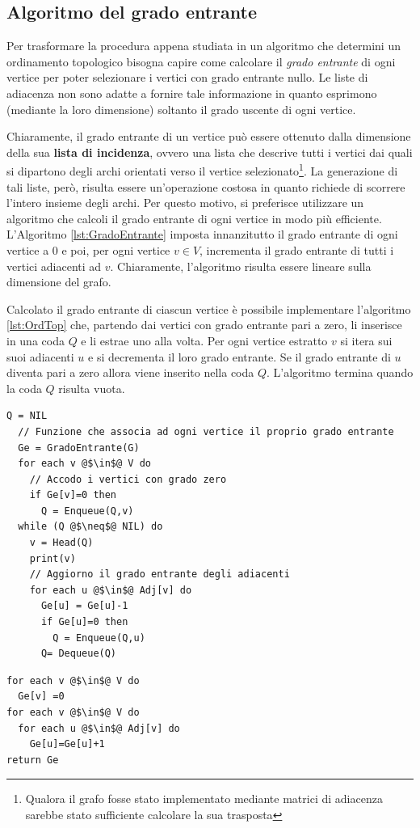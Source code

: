 \subsection{Algoritmo del grado entrante}
Per trasformare la procedura appena studiata in un algoritmo che determini un ordinamento topologico bisogna capire come calcolare il \textit{grado entrante} di ogni vertice per poter selezionare i vertici con grado entrante nullo. Le liste di adiacenza non sono adatte a fornire tale informazione in quanto esprimono (mediante la loro dimensione) soltanto il grado uscente di ogni vertice.

Chiaramente, il grado entrante di un vertice può essere ottenuto dalla dimensione della sua \textbf{lista di incidenza}, ovvero una lista che descrive tutti i vertici dai quali si dipartono degli archi orientati verso il vertice selezionato\footnote{Qualora il grafo fosse stato implementato mediante matrici di adiacenza sarebbe stato sufficiente calcolare la sua trasposta}. La generazione di tali liste, però, risulta essere un'operazione costosa in quanto richiede di scorrere l'intero insieme degli archi. Per questo motivo, si preferisce utilizzare un algoritmo che calcoli il grado entrante di ogni vertice in modo più efficiente.
L'Algoritmo \ref{lst:GradoEntrante} imposta innanzitutto il grado entrante di ogni vertice a $0$ e poi, per ogni vertice $v \in V$, incrementa il grado entrante di tutti i vertici adiacenti ad $v$. Chiaramente, l'algoritmo risulta essere lineare sulla dimensione del grafo.

Calcolato il grado entrante di ciascun vertice è possibile implementare l'algoritmo \ref{lst:OrdTop} che, partendo dai vertici con grado entrante pari a zero, li inserisce in una coda $Q$ e li estrae uno alla volta. Per ogni vertice estratto $v$ si itera sui suoi adiacenti $u$ e si decrementa il loro grado entrante. Se il grado entrante di $u$ diventa pari a zero allora viene inserito nella coda $Q$. L'algoritmo termina quando la coda $Q$ risulta vuota.

\begin{lstlisting}[caption={\textsc{OrdinamentoTopologico}(G)},language=asd,label=lst:OrdTop]
  Q = NIL
  // Funzione che associa ad ogni vertice il proprio grado entrante
  Ge = GradoEntrante(G)
  for each v @$\in$@ V do
    // Accodo i vertici con grado zero
    if Ge[v]=0 then
      Q = Enqueue(Q,v)
  while (Q @$\neq$@ NIL) do
    v = Head(Q)
    print(v)
    // Aggiorno il grado entrante degli adiacenti
    for each u @$\in$@ Adj[v] do
      Ge[u] = Ge[u]-1
      if Ge[u]=0 then
        Q = Enqueue(Q,u)
      Q= Dequeue(Q)
\end{lstlisting}
\begin{lstlisting}[language=asd,caption={\textsc{GradoEntrante}(G)},label=lst:GradoEntrante]
for each v @$\in$@ V do
  Ge[v] =0
for each v @$\in$@ V do
  for each u @$\in$@ Adj[v] do
    Ge[u]=Ge[u]+1
return Ge
\end{lstlisting}

